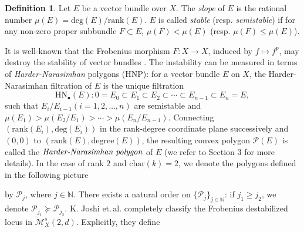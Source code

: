 \documentclass{kms-b}
\numberwithin{equation}{section}
\theoremstyle{plain}
\theoremstyle{definition}
\newtheorem{definition}{Definition}
\theoremstyle{remark}
\begin{document}
\begin{definition}
Let $E$ be a vector bundle over $X$. The \emph{slope} of $E$ is the rational number $\mu(E)=\mathrm{deg}(E)/\mathrm{rank}(E)$.
$E$ is called \emph{stable} (resp. \emph{semistable}) if for any non-zero proper subbundle $F \subset E$,
$\mu(F) < \mu(E)$ (resp. $\mu(F) \leqslant  \mu(E)$).
\end{definition}
It is well-known that the Frobenius morphism $F:X \to X$, induced by $f \mapsto f^p$, may destroy the stability of vector bundles \cite{Gieseker73}. The instability can be measured in terms of \emph{Harder-Narasimhan} polygons (HNP): for a vector bundle $E$ on $X$, the Harder-Narasimhan filtration of $E$ is the unique filtration
\begin{equation}
\mathrm{HN}_{\bullet}(E): 0=E_0 \subset E_1 \subset E_2 \subset\cdots \subset  E_{n-1} \subset E_n = E, \nonumber
\end{equation}
such that $E_{i} / E_{i-1}(i=1,2,\dots, n)$ are semistable and
$\mu(E_1) >\mu(E_2/E_1) > \cdots > \mu(E_n /E_{n-1} )$. 
Connecting $(\mathrm{rank}(E_i),\mathrm{deg}(E_i))$ in the rank-degree coordinate plane successively and $(0,0)$ to $(\mathrm{rank}(E), \mathrm{degree}(E))$, the resulting convex polygon $\mathscr{P}(E)$ is called the $\emph{Harder-Narasimhan polygon}$ of $E$ (we refer to \cite{Shatz77} Section 3 for more details). In the case of rank $2$ and $\mathrm{char}(k)=2$, we denote the polygons defined in the following picture
\newline
\begin{center}
\end{center}
by $\mathscr{P}_j$, where $j\in \mathbb{N}$. There exists a natural order  on $\{\mathscr{P}_j\}_{j\in \mathbb{N}}$: if $j_1\geqslant j_2$, we denote $\mathscr{P}_{j_1} \succcurlyeq \mathscr{P}_{j_2}$. K. Joshi et.\,al. \cite{JRXY06} completely classify the Frobenius destabilized locus in $\mathcal{M}^s_X(2,d)$. Explicitly, they define 
\end{document}
